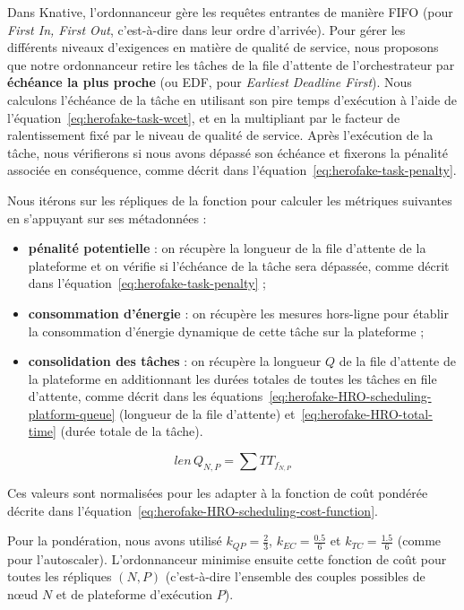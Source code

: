Dans Knative, l'ordonnanceur gère les requêtes entrantes de manière \gls{FIFO} (pour \textit{First In, First Out}, c'est-à-dire dans leur ordre d'arrivée). Pour gérer les différents niveaux d'exigences en matière de qualité de service, nous proposons que notre ordonnanceur retire les tâches de la file d'attente de l'orchestrateur par \textbf{échéance la plus proche} (ou \gls{EDF}, pour \textit{Earliest Deadline First}). Nous calculons l'échéance de la tâche en utilisant son pire temps d'exécution à l'aide de l'équation~\ref{eq:herofake-task-wcet}, et en la multipliant par le facteur de ralentissement fixé par le niveau de qualité de service. Après l'exécution de la tâche, nous vérifierons si nous avons dépassé son échéance et fixerons la pénalité associée en conséquence, comme décrit dans l'équation~\ref{eq:herofake-task-penalty}. 

Nous itérons sur les répliques de la fonction pour calculer les métriques suivantes en s'appuyant sur ses métadonnées :

\begin{itemize}
    \item \textbf{pénalité potentielle} : on récupère la longueur de la file d'attente de la plateforme et on vérifie si l'échéance de la tâche sera dépassée, comme décrit dans l'équation~\ref{eq:herofake-task-penalty} ;
    \item \textbf{consommation d'énergie} : on récupère les mesures hors-ligne pour établir la consommation d'énergie dynamique de cette tâche sur la plateforme ;
    \item \textbf{consolidation des tâches} : on récupère la longueur $Q$ de la file d'attente de la plateforme en additionnant les durées totales de toutes les tâches en file d'attente, comme décrit dans les équations~\ref{eq:herofake-HRO-scheduling-platform-queue} (longueur de la file d'attente) et~\ref{eq:herofake-HRO-total-time} (durée totale de la tâche).
\end{itemize}

\begin{equation}
    len \, Q_{N, P} = \sum TT_{f_{N, P}}
\label{eq:herofake-HRO-scheduling-platform-queue}
\end{equation}

Ces valeurs sont normalisées pour les adapter à la fonction de coût pondérée décrite dans l'équation~\ref{eq:herofake-HRO-scheduling-cost-function}.

Pour la pondération, nous avons utilisé $k_{QP} = \frac{2}{3}$, $k_{EC} = \frac{0.5}{6}$ et $k_{TC} = \frac{1.5}{6}$ (comme pour l'autoscaler). L'ordonnanceur minimise ensuite cette fonction de coût pour toutes les répliques $(N, P)$ (c'est-à-dire l'ensemble des couples possibles de nœud $N$ et de plateforme d'exécution $P$).

